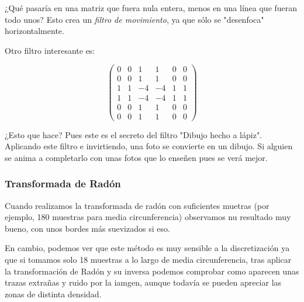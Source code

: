 		¿Qué pasaría en una matriz que fuera nula entera, menos en una línea que fueran todo unos?  Esto crea un \emph{filtro de movimiento}, ya que sólo se "desenfoca" horizontalmente.


		Otro filtro interesante es:

		\[ \begin{pmatrix}
			0 & 0 & 1 & 1 & 0 & 0\\
			0 & 0 & 1 & 1 & 0 & 0\\
			1 & 1 & -4 & -4  & 1 & 1\\
			1 & 1 & -4 & -4  & 1 & 1\\
			0 & 0 & 1 & 1 & 0 & 0\\
			0 & 0 & 1 & 1 & 0 & 0
			\end{pmatrix}\]

		¿Esto que hace? Pues este es el secreto del filtro "Dibujo hecho a lápiz". Aplicando este filtro e invirtiendo, una foto se convierte en un dibujo. Si alguien se anima a completarlo con unas fotos que lo enseñen pues se verá mejor.


	\subsubsection{Transformada de Radón}

		Cuando realizamos la transformada de radón con suficientes muetras (por ejemplo, 180 muestras para media circunferencia) observamos nu resultado muy bueno, con unos bordes más suevizados si eso.

		En cambio, podemos ver que este método es muy sensible a la discretización ya que si tomamos solo 18 muestras a lo largo de media circunferencia, tras aplicar la transformación de Radón y su inversa podemos comprobar como aparecen unas trazas extrañas y ruido por la iamgen, aunque todavía se pueden apreciar las zonas de distinta densidad.








